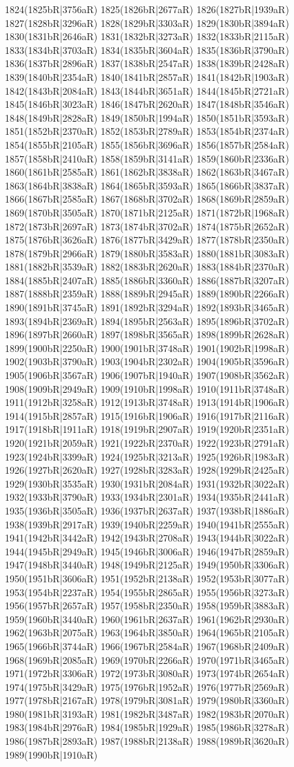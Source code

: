 1824(1825bR|3756aR) 1825(1826bR|2677aR) 1826(1827bR|1939aR) 1827(1828bR|3296aR) 1828(1829bR|3303aR) 1829(1830bR|3894aR) 1830(1831bR|2646aR) 1831(1832bR|3273aR) 1832(1833bR|2115aR) 1833(1834bR|3703aR) 1834(1835bR|3604aR) 1835(1836bR|3790aR) 1836(1837bR|2896aR) 1837(1838bR|2547aR) 1838(1839bR|2428aR) 1839(1840bR|2354aR) 1840(1841bR|2857aR) 1841(1842bR|1903aR) 1842(1843bR|2084aR) 1843(1844bR|3651aR) 1844(1845bR|2721aR) 1845(1846bR|3023aR) 1846(1847bR|2620aR) 1847(1848bR|3546aR) 1848(1849bR|2828aR) 1849(1850bR|1994aR) 1850(1851bR|3593aR) 1851(1852bR|2370aR) 1852(1853bR|2789aR) 1853(1854bR|2374aR) 1854(1855bR|2105aR) 1855(1856bR|3696aR) 1856(1857bR|2584aR) 1857(1858bR|2410aR) 1858(1859bR|3141aR) 1859(1860bR|2336aR) 1860(1861bR|2585aR) 1861(1862bR|3838aR) 1862(1863bR|3467aR) 1863(1864bR|3838aR) 1864(1865bR|3593aR) 1865(1866bR|3837aR) 1866(1867bR|2585aR) 1867(1868bR|3702aR) 1868(1869bR|2859aR) 1869(1870bR|3505aR) 1870(1871bR|2125aR) 1871(1872bR|1968aR) 1872(1873bR|2697aR) 1873(1874bR|3702aR) 1874(1875bR|2652aR) 1875(1876bR|3626aR) 1876(1877bR|3429aR) 1877(1878bR|2350aR) 1878(1879bR|2966aR) 1879(1880bR|3583aR) 1880(1881bR|3083aR) 1881(1882bR|3539aR) 1882(1883bR|2620aR) 1883(1884bR|2370aR) 1884(1885bR|2407aR) 1885(1886bR|3360aR) 1886(1887bR|3207aR) 1887(1888bR|2359aR) 1888(1889bR|2945aR) 1889(1890bR|2266aR) 1890(1891bR|3745aR) 1891(1892bR|3294aR) 1892(1893bR|3465aR) 1893(1894bR|2369aR) 1894(1895bR|2563aR) 1895(1896bR|3702aR) 1896(1897bR|2660aR) 1897(1898bR|3565aR) 1898(1899bR|2628aR) 1899(1900bR|2250aR) 1900(1901bR|3748aR) 1901(1902bR|1998aR) 1902(1903bR|3790aR) 1903(1904bR|2302aR) 1904(1905bR|3596aR) 1905(1906bR|3567aR) 1906(1907bR|1940aR) 1907(1908bR|3562aR) 1908(1909bR|2949aR) 1909(1910bR|1998aR) 1910(1911bR|3748aR) 1911(1912bR|3258aR) 1912(1913bR|3748aR) 1913(1914bR|1906aR) 1914(1915bR|2857aR) 1915(1916bR|1906aR) 1916(1917bR|2116aR) 1917(1918bR|1911aR) 1918(1919bR|2907aR) 1919(1920bR|2351aR) 1920(1921bR|2059aR) 1921(1922bR|2370aR) 1922(1923bR|2791aR) 1923(1924bR|3399aR) 1924(1925bR|3213aR) 1925(1926bR|1983aR) 1926(1927bR|2620aR) 1927(1928bR|3283aR) 1928(1929bR|2425aR) 1929(1930bR|3535aR) 1930(1931bR|2084aR) 1931(1932bR|3022aR) 1932(1933bR|3790aR) 1933(1934bR|2301aR) 1934(1935bR|2441aR) 1935(1936bR|3505aR) 1936(1937bR|2637aR) 1937(1938bR|1886aR) 1938(1939bR|2917aR) 1939(1940bR|2259aR) 1940(1941bR|2555aR) 1941(1942bR|3442aR) 1942(1943bR|2708aR) 1943(1944bR|3022aR) 1944(1945bR|2949aR) 1945(1946bR|3006aR) 1946(1947bR|2859aR) 1947(1948bR|3440aR) 1948(1949bR|2125aR) 1949(1950bR|3306aR) 1950(1951bR|3606aR) 1951(1952bR|2138aR) 1952(1953bR|3077aR) 1953(1954bR|2237aR) 1954(1955bR|2865aR) 1955(1956bR|3273aR) 1956(1957bR|2657aR) 1957(1958bR|2350aR) 1958(1959bR|3883aR) 1959(1960bR|3440aR) 1960(1961bR|2637aR) 1961(1962bR|2930aR) 1962(1963bR|2075aR) 1963(1964bR|3850aR) 1964(1965bR|2105aR) 1965(1966bR|3744aR) 1966(1967bR|2584aR) 1967(1968bR|2409aR) 1968(1969bR|2085aR) 1969(1970bR|2266aR) 1970(1971bR|3465aR) 1971(1972bR|3306aR) 1972(1973bR|3080aR) 1973(1974bR|2654aR) 1974(1975bR|3429aR) 1975(1976bR|1952aR) 1976(1977bR|2569aR) 1977(1978bR|2167aR) 1978(1979bR|3081aR) 1979(1980bR|3360aR) 1980(1981bR|3193aR) 1981(1982bR|3487aR) 1982(1983bR|2070aR) 1983(1984bR|2976aR) 1984(1985bR|1929aR) 1985(1986bR|3278aR) 1986(1987bR|2893aR) 1987(1988bR|2138aR) 1988(1989bR|3620aR) 1989(1990bR|1910aR) 